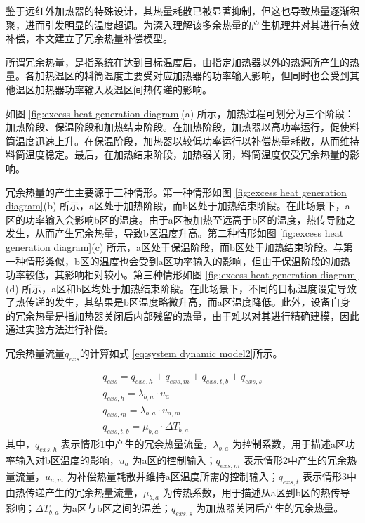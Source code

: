 鉴于远红外加热器的特殊设计，其热量耗散已被显著抑制，但这也导致热量逐渐积聚，进而引发明显的温度超调。为深入理解该多余热量的产生机理并对其进行有效补偿，本文建立了冗余热量补偿模型。\par

所谓冗余热量，是指系统在达到目标温度后，由指定加热器以外的热源所产生的热量。各加热温区的料筒温度主要受对应加热器的功率输入影响，但同时也会受到其他温区加热器功率输入及温区间热传递的影响。\par

如图 \ref{fig:excess heat generation diagram}(a) 所示，加热过程可划分为三个阶段：加热阶段、保温阶段和加热结束阶段。在加热阶段，加热器以高功率运行，促使料筒温度迅速上升。在保温阶段，加热器以较低功率运行以补偿热量耗散，从而维持料筒温度稳定。最后，在加热结束阶段，加热器关闭，料筒温度仅受冗余热量的影响。\par

冗余热量的产生主要源于三种情形。第一种情形如图 \ref{fig:excess heat generation diagram}(b) 所示，a区处于加热阶段，而b区处于加热结束阶段。在此场景下，a区的功率输入会影响b区的温度。由于a区被加热至远高于b区的温度，热传导随之发生，从而产生冗余热量，导致b区温度升高。第二种情形如图 \ref{fig:excess heat generation diagram}(c) 所示，a区处于保温阶段，而b区处于加热结束阶段。与第一种情形类似，b区的温度也会受到a区功率输入的影响，但由于保温阶段的加热功率较低，其影响相对较小。第三种情形如图 \ref{fig:excess heat generation diagram}(d) 所示，a区和b区均处于加热结束阶段。在此场景下，不同的目标温度设定导致了热传递的发生，其结果是b区温度略微升高，而a区温度降低。此外，设备自身的冗余热量是指加热器关闭后内部残留的热量，由于难以对其进行精确建模，因此通过实验方法进行补偿。\par

冗余热量流量$q_{exs}$的计算如式 \ref{eq:system dynamic model2}所示。\par
\begin{equation}
    \begin{aligned}
        q_{exs} = q_{exs,h} + q_{exs,m} + q_{exs,t,b} + q_{exs,s}
        \\ 
        q_{exs,h} = \lambda_{b,a} \cdot u_{a}
        \\
        q_{exs,m} = \lambda_{b,a} \cdot u_{a,m}
        \\
        q_{exs,t,b} = \mu_{b,a} \cdot \Delta T_{b,a}
    \end{aligned}
    \label{eq:system dynamic model2}
\end{equation}
其中，$q_{exs,h}$ 表示情形1中产生的冗余热量流量，$\lambda_{b,a}$ 为控制系数，用于描述a区功率输入对b区温度的影响，$u_a$ 为a区的控制输入；$q_{exs,m}$ 表示情形2中产生的冗余热量流量，$u_{a,m}$ 为补偿热量耗散并维持a区温度所需的控制输入；$q_{exs,t}$ 表示情形3中由热传递产生的冗余热量流量，$\mu_{b,a}$ 为传热系数，用于描述从a区到b区的热传导影响；$\Delta T_{b,a}$ 为a区与b区之间的温差；$q_{exs,s}$ 为加热器关闭后产生的冗余热量。

